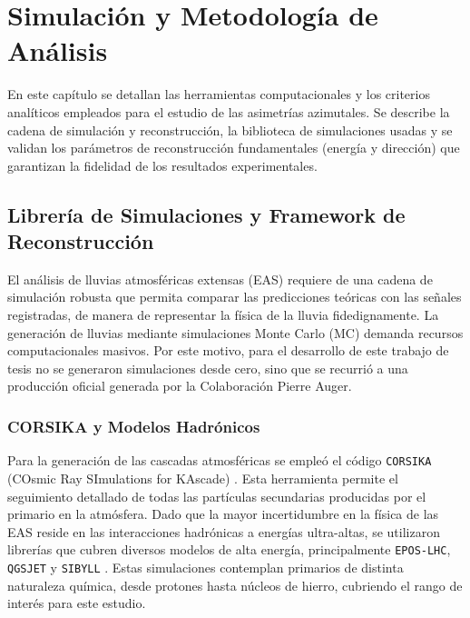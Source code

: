 
\chapter{Simulación y Metodología de Análisis}
\label{cap:metodologia}

En este capítulo se detallan las herramientas computacionales y los criterios analíticos empleados para el estudio de las asimetrías azimutales. Se describe la cadena de simulación y reconstrucción, la biblioteca de simulaciones usadas y se validan los parámetros de reconstrucción fundamentales (energía y dirección) que garantizan la fidelidad de los resultados experimentales.

\section{Librería de Simulaciones y Framework de Reconstrucción}

El análisis de lluvias atmosféricas extensas (EAS) requiere de una cadena de simulación robusta que permita comparar las predicciones teóricas con las señales registradas, de manera de representar la física de la lluvia fidedignamente. La generación de lluvias mediante simulaciones Monte Carlo (MC) demanda recursos computacionales masivos. Por este motivo, para el desarrollo de este trabajo de tesis no se generaron simulaciones desde cero, sino que se recurrió a una producción oficial generada por la Colaboración Pierre Auger.

\subsection{CORSIKA y Modelos Hadrónicos}
Para la generación de las cascadas atmosféricas se empleó el código \texttt{CORSIKA} (COsmic Ray SImulations for KAscade) \cite{heck1998corsika}. Esta herramienta permite el seguimiento detallado de todas las partículas secundarias producidas por el primario en la atmósfera. Dado que la mayor incertidumbre en la física de las EAS reside en las interacciones hadrónicas a energías ultra-altas, se utilizaron librerías que cubren diversos modelos de alta energía, principalmente \texttt{EPOS-LHC}, \texttt{QGSJET} y \texttt{SIBYLL} \cite{pierog2015epos, riehn2020sibyll, ostapchenko2011qgsjet}. Estas simulaciones contemplan primarios de distinta naturaleza química, desde protones hasta núcleos de hierro, cubriendo el rango de interés para este estudio.

